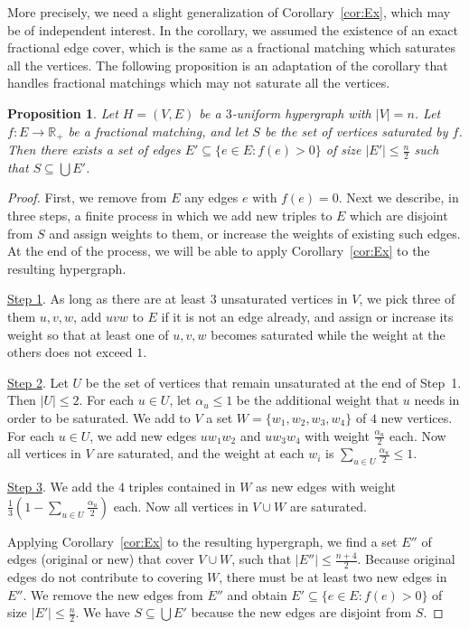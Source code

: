 \documentclass{article}
\newtheorem{proposition}[theorem]{Proposition}
\theoremstyle{definition}
\begin{document}
More precisely, we need a slight generalization of Corollary~\ref{cor:Ex}, which may be of independent interest. In the corollary, we assumed the existence of an exact fractional edge cover, which is the same as a fractional matching which saturates all the vertices. The following proposition is an adaptation of the corollary that handles fractional matchings which may not saturate all the vertices.
\begin{proposition} \label{pro:SAT}
Let $H = (V, E)$ be a $3$-uniform hypergraph with $|V| = n$. Let $f: E \to \mathbb{R}_+$ be a fractional matching, and let $S$ be the set of vertices saturated by $f$. Then there exists a set of edges $E' \subseteq \{ e \in E: f(e) > 0\}$ of size $|E'| \le \frac{n}{2}$ such that $S \subseteq \bigcup E'$.
\end{proposition}
\begin{proof} First, we remove from $E$ any edges $e$ with $f(e) = 0$. Next we describe, in three steps, a finite process in which we add new triples to $E$ which are disjoint from  $S$ and assign weights to them, or increase the weights of existing such edges. At the end of the process, we will be able to apply Corollary~\ref{cor:Ex} to the resulting hypergraph.

\vspace{5pt}

\noindent \underline{Step 1}. As long as there are at least $3$ unsaturated vertices in $V$, we pick three of them $u, v, w$, add $uvw$ to $E$ if it is not an edge already, and assign or increase its weight so that at least one of $u, v, w$ becomes saturated while the weight at the others does not exceed $1$.

\vspace{5pt}

\noindent \underline{Step 2}. Let $U$ be the set of vertices that remain unsaturated at the end of Step~1. Then $|U| \le 2$. For each $u \in U$, let $\alpha_u \le 1$ be the additional weight that $u$ needs in order to be saturated. We add to $V$ a set $W = \{w_1, w_2, w_3, w_4\}$ of $4$ new vertices. For each $u \in U$, we add new edges $uw_1w_2$ and $uw_3w_4$ with weight $\frac{\alpha_u}{2}$ each. Now all vertices in $V$ are saturated, and the weight at each $w_i$ is $\sum_{u \in U} \frac{\alpha_u}{2} \le 1$.

\vspace{5pt}

\noindent \underline{Step 3}. We add the $4$ triples contained in $W$ as new edges with weight $\frac{1}{3}(1 - \sum_{u \in U} \frac{\alpha_u}{2})$ each. Now all vertices in $V \cup W$ are saturated.

\vspace{5pt}

Applying Corollary~\ref{cor:Ex} to the resulting hypergraph, we find a set $E''$ of edges (original or new) that cover $V \cup W$, such that $|E''| \le \frac{n+4}{2}$. Because original edges do not contribute to covering $W$, there must be at least two new edges in $E''$. We remove the new edges from $E''$ and obtain $E' \subseteq \{e \in E: f(e) > 0\}$ of size $|E'| \le \frac{n}{2}$. We have $S \subseteq \bigcup E'$ because the new edges are disjoint from $S$.
\end{proof}
\end{document}
